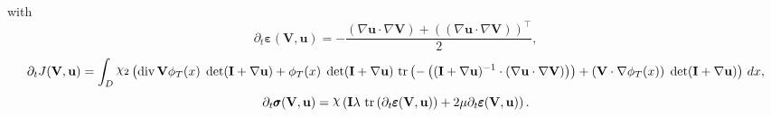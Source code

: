\documentclass[preview]{standalone}
\let\oldcdot\cdot
\let\cdot\oldcdot
\begin{document}
with
\begin{dmath*}
\partial_{t} \pmb \varepsilon({\mathbf V},{\mathbf{ u }}) = - \frac{\left(  \nabla {\mathbf{ u }}  \cdot  \nabla {\mathbf V}  \right) +  \left( \left(  \nabla {\mathbf{ u }}  \cdot  \nabla {\mathbf V}  \right) \right)^\top }{2},
 \end{dmath*}
\begin{dmath*}
\partial_{t} J({\mathbf V},{\mathbf{ u }}) =  \int_{D} \raisebox{\depth}{$\chi_2$} \left(\operatorname{div} {\mathbf V} \phi_{T}(x)  \;\operatorname{det}(\mathbf{I} +  \nabla {\mathbf{ u }} )  + \phi_{T}(x)  \;\operatorname{det}(\mathbf{I} +  \nabla {\mathbf{ u }} )   \,\operatorname{tr}\left(- \left(  (\mathbf{I} +  \nabla {\mathbf{ u }} )^{-1}  \cdot \left(  \nabla {\mathbf{ u }}  \cdot  \nabla {\mathbf V}  \right) \right)\right)  + \left( {\mathbf V} \cdot  \nabla \phi_{T}(x)  \right)  \;\operatorname{det}(\mathbf{I} +  \nabla {\mathbf{ u }} ) \right) \,dx,
 \end{dmath*}
\begin{dmath*}
\partial_{t} \pmb \sigma({\mathbf V},{\mathbf{ u }}) = \raisebox{\depth}{$\chi$} \left(\mathbf{I} \lambda  \,\operatorname{tr}\left(\partial_{t} \pmb \varepsilon({\mathbf V},{\mathbf{ u }})\right)  + 2 \mu \partial_{t} \pmb \varepsilon({\mathbf V},{\mathbf{ u }})\right).
 \end{dmath*}
\end{document}
